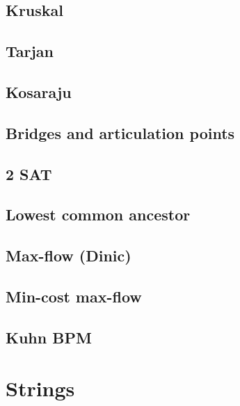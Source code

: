 \subsection{Kruskal}
\raggedbottom
\hrulefill
\subsection{Tarjan}
\raggedbottom
\hrulefill
\subsection{Kosaraju}
\raggedbottom
\hrulefill
\subsection{Bridges and articulation points}
\raggedbottom
\hrulefill
\subsection{2 SAT}
\raggedbottom
\hrulefill
\subsection{Lowest common ancestor}
\raggedbottom
\hrulefill
\subsection{Max-flow (Dinic)}
\raggedbottom
\hrulefill
\subsection{Min-cost max-flow}
\raggedbottom
\hrulefill
\subsection{Kuhn BPM}
\raggedbottom
\hrulefill

\section{Strings}
